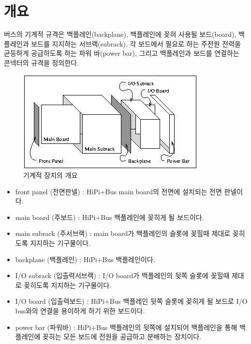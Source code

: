 \section{개요}
버스의 기계적 규격은 백플레인(backplane), 백플레인에 꽂혀 사용될 보드(board),
백플레인과 보드를 지지하는 서브랙(subrack),
각 보드에서 필요로 하는 주전원 전력을 균등하게 공급하도록 하는 파워 바(power bar),
그리고 백플레인과 보드를 연결하는 콘넥터의 규격을 정의한다.
%
\begin{figure}[htb]
    \centerline{\includegraphics{ch8/FIG/mech-over.jpg}}
   \caption{기계적 장치의 개요}\label{figure:mech-over}
\end{figure}
%
\begin{itemize}
  \item front panel (전면판넬) : HiPi+Bus main board의 전면에 설치되는 전면 판넬이다.
  \item main board (주보드) : HiPi+Bus 백플레인에 꽂히게 될 보드이다.
  \item main subrack (주서브랙) : main board가 백플레인의 슬롯에 꽂힐때 제대로 꽂히도록 지지하는 기구물이다.
  \item backplane (백플레인) : HiPi+Bus 백플레인이다.
  \item I/O subrack (입출력서브랙) : I/O board가 백플레인의 뒷쪽 슬롯에 꽂힐때 제대로 꽂히도록 지지하는 기구물이다.
  \item I/O board (입출력보드) : HiPi+Bus 백플레인 뒷쪽 슬롯에 꽂히게 될 보드로 I/O bus와의 연결을
		용이하게 하기 위한 보드이다.
  \item power bar (파워바) : HiPi+Bus 백플레인의 뒷쪽에 설치되어 백플레인을 통해 백플레인에 꽂히는 모든 보드에
		전원을 공급하고 분배하는 장치이다.
\end{itemize}
